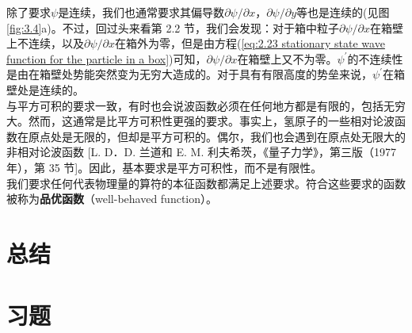 	\indent 除了要求$\psi$是连续，我们也通常要求其偏导数$\partial\psi/\partial x$，$\partial\psi/\partial y$等也是连续的(见图\ref{fig:3.4}a)。不过，回过头来看第 2.2 节，我们会发现：对于箱中粒子$\partial\psi/\partial x$在箱壁上不连续，以及$\partial\psi/\partial x$在箱外为零，但是由方程(\ref{eq:2.23 stationary state wave function for the particle in a box})可知，$\partial\psi/\partial x$在箱壁上又不为零。$\psi^{\prime}$的不连续性是由在箱壁处势能突然变为无穷大造成的。对于具有有限高度的势垒来说，$\psi^{\prime}$在箱壁处是连续的。\\
	\indent 与平方可积的要求一致，有时也会说波函数必须在任何地方都是有限的，包括无穷大。然而，这通常是比平方可积性更强的要求。事实上，氢原子的一些相对论波函数在原点处是无限的，但却是平方可积的。偶尔，我们也会遇到在原点处无限大的非相对论波函数 [L. D．D. 兰道和 E. M. 利夫希茨，《量子力学》，第三版（1977 年），第 35 节]。因此，基本要求是平方可积性，而不是有限性。\\
	\indent 我们要求任何代表物理量的算符的本征函数都满足上述要求。符合这些要求的函数被称为\textbf{品优函数}（well-behaved function）。

\section*{总结}

\section*{习题}